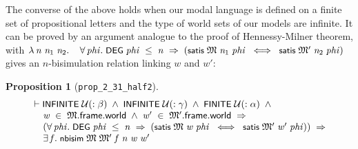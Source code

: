 \documentclass[letterpaper]{article}
\newtheorem{prop}{Proposition}
\renewcommand{\HOLConst}[1]{{\textsf{\upshape\small #1}}}
\renewcommand{\HOLinline}[1]{\ensuremath{#1}}
\newenvironment{holmath}{\begin{displaymath}\begin{array}{l}}{\end{array}\end{displaymath}\ignorespacesafterend}
\begin{document}
The converse of the above holds when our modal language is defined on a finite set of propositional letters and the type of world sets of our models are infinite. It can be proved by an argument analogue to the proof of Hennessy-Milner theorem, with \HOLinline{\HOLTokenLambda{}\HOLBoundVar{n}\;\HOLBoundVar{n\sb{\mathrm{1}}}\;\HOLBoundVar{n\sb{\mathrm{2}}}.\\
\;\;\;\;\HOLSymConst{\HOLTokenForall{}}\HOLBoundVar{phi}.\;\HOLConst{DEG}\;\HOLBoundVar{phi}\;\HOLSymConst{\HOLTokenLeq{}}\;\HOLBoundVar{n}\;\HOLSymConst{\HOLTokenImp{}}\;(\HOLConst{satis}\;\HOLFreeVar{\ensuremath{\mathfrak{M}}}\;\HOLBoundVar{n\sb{\mathrm{1}}}\;\HOLBoundVar{phi}\;\HOLSymConst{\HOLTokenEquiv{}}\;\HOLConst{satis}\;\HOLFreeVar{\ensuremath{\mathfrak{M}'}}\;\HOLBoundVar{n\sb{\mathrm{2}}}\;\HOLBoundVar{phi})} gives an $n$-bisimulation relation linking $w$ and $w'$:
\begin{prop}[\texttt{prop_2_31_half2}]
\begin{holmath}
  \ensuremath{\HOLTokenTurnstile}\HOLConst{INFINITE}\;\ensuremath{\cal{U}}(:\ensuremath{\beta})\;\HOLSymConst{\HOLTokenConj{}}\;\HOLConst{INFINITE}\;\ensuremath{\cal{U}}(:\ensuremath{\gamma})\;\HOLSymConst{\HOLTokenConj{}}\;\HOLConst{FINITE}\;\ensuremath{\cal{U}}(:\ensuremath{\alpha})\;\HOLSymConst{\HOLTokenConj{}}\\
\;\;\;\;\;\HOLFreeVar{w}\;\HOLSymConst{\HOLTokenIn{}}\;\HOLFreeVar{\ensuremath{\mathfrak{M}}}.\HOLFieldName{frame}.\HOLFieldName{world}\;\HOLSymConst{\HOLTokenConj{}}\;\HOLFreeVar{w\sp{\prime}}\;\HOLSymConst{\HOLTokenIn{}}\;\HOLFreeVar{\ensuremath{\mathfrak{M}'}}.\HOLFieldName{frame}.\HOLFieldName{world}\;\HOLSymConst{\HOLTokenImp{}}\\
\;\;\;\;\;(\HOLSymConst{\HOLTokenForall{}}\HOLBoundVar{phi}.\;\HOLConst{DEG}\;\HOLBoundVar{phi}\;\HOLSymConst{\HOLTokenLeq{}}\;\HOLFreeVar{n}\;\HOLSymConst{\HOLTokenImp{}}\;(\HOLConst{satis}\;\HOLFreeVar{\ensuremath{\mathfrak{M}}}\;\HOLFreeVar{w}\;\HOLBoundVar{phi}\;\HOLSymConst{\HOLTokenEquiv{}}\;\HOLConst{satis}\;\HOLFreeVar{\ensuremath{\mathfrak{M}'}}\;\HOLFreeVar{w\sp{\prime}}\;\HOLBoundVar{phi}))\;\HOLSymConst{\HOLTokenImp{}}\\
\;\;\;\;\;\HOLSymConst{\HOLTokenExists{}}\HOLBoundVar{f}.\;\HOLConst{nbisim}\;\HOLFreeVar{\ensuremath{\mathfrak{M}}}\;\HOLFreeVar{\ensuremath{\mathfrak{M}'}}\;\HOLBoundVar{f}\;\HOLFreeVar{n}\;\HOLFreeVar{w}\;\HOLFreeVar{w\sp{\prime}}
\end{holmath} 
\end{prop}
\end{document}
